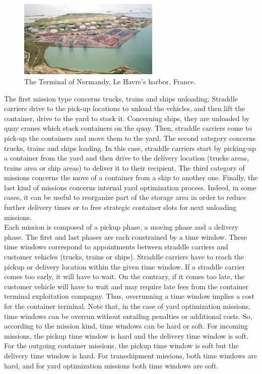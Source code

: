 \documentclass[a4paper,10pt]{article}
\begin{document}
\begin{figure}[ht]
  \begin{center}
  \includegraphics[width=0.6\textwidth]{Figures/terminalOfNormandy}
  \caption{The Terminal of Normandy, Le Havre's harbor, France.}
\end{center}
\end{figure}


The first mission type concerns trucks, trains and ships unloading. Straddle carriers drive to the pick-up locations to unload the vehicles, and then lift the container, drive to the yard to stock it. Concerning ships, they are unloaded by quay cranes which stack containers on the quay. Then, straddle carriers come to pick-up the containers and move them to the yard.
The second category concerns trucks, trains and ships loading. In this case, straddle carriers start by picking-up a container from the yard and then drive to the delivery location (trucks areas, trains area or ship areas) to deliver it to their recipient. 
The third category of missions concerns the move of a container from a ship to another one.
Finally, the last kind of missions concerns internal yard optimization process. Indeed, in some cases, it can be useful to reorganize part of the storage area in order to reduce further delivery times or to free strategic container slots for next unloading missions.\\

Each mission is composed of a pickup phase, a moving phase and a delivery phase. The first and last phases are each constrained by a time window. These time windows correspond to appointments between straddle carriers and customer vehicles (trucks, trains or ships). Straddle carriers have to reach the pickup or delivery location within the given time window. If a straddle carrier comes too early, it will have to wait. On the contrary, if it comes too late, the customer vehicle will have to wait and may require late fees from the container terminal exploitation compagny. Thus, overrunning a time window implies a cost for the container terminal. Note that, in the case of yard optimization missions, time windows can be overrun without entailing penalties or additional costs. So, according to the mission kind, time windows can be hard or soft. For incoming missions, the pickup time window is hard and the delivery time window is soft. For the outgoing container missions, the pickup time window is soft but the 
delivery time window is hard. For transshipment missions, both time windows are hard, and for yard optimization missions both time windows are soft. 
\end{document}
